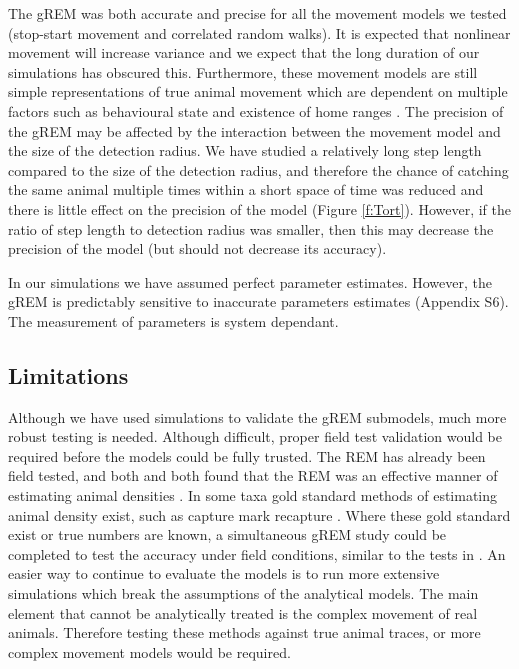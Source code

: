 \documentclass[a4paper,10pt,reqno,oneside]{amsart}
\begin{document}
The gREM was both accurate and precise for all the movement models we tested (stop-start movement and correlated random walks). It is expected that nonlinear movement will increase variance \citep{Hutchinson_Waser_2007} and we expect that the long duration of our simulations has obscured this. Furthermore, these movement models are still simple representations of true animal movement which are dependent on multiple factors such as behavioural state and existence of home ranges \citep{smouse2010stochastic}. The precision of the gREM may be affected by the interaction between the movement model and the size of the detection radius. We have studied a relatively long step length compared to the size of the detection radius, and therefore the chance of catching the same animal multiple times within a short space of time was reduced and there is little effect on the precision of the model (Figure \ref{f:Tort}). However, if the ratio of step length to detection radius was smaller, then this may decrease the precision of the model (but should not decrease its accuracy). 

In our simulations we have assumed perfect parameter estimates. However, the gREM is predictably sensitive to inaccurate parameters estimates (Appendix S6). The measurement of parameters is system dependant. 

\subsection*{Limitations}
Although we have used simulations to validate the gREM submodels, much more robust testing is needed. Although difficult, proper field test validation would be required before the models could be fully trusted. The REM \citep{rowcliffe2008estimating} has already been field tested, and both \citet{rowcliffe2008estimating} and \citet{zero2013monitoring} both found that the REM was an effective manner of estimating animal densities \citep{rowcliffe2008estimating, zero2013monitoring}. In some taxa gold standard methods of estimating animal density exist, such as capture mark recapture \citep{sollmann2013using}. Where these gold standard exist or true numbers are known, a simultaneous gREM study could be completed to test the accuracy under field conditions, similar to the tests in \citet{rowcliffe2008estimating}. An easier way to continue to evaluate the models is to run more extensive simulations which break the assumptions of the analytical models. The main element that cannot be analytically treated is the complex movement of real animals. Therefore testing these methods against true animal traces, or more complex movement models would be required.
\end{document}
